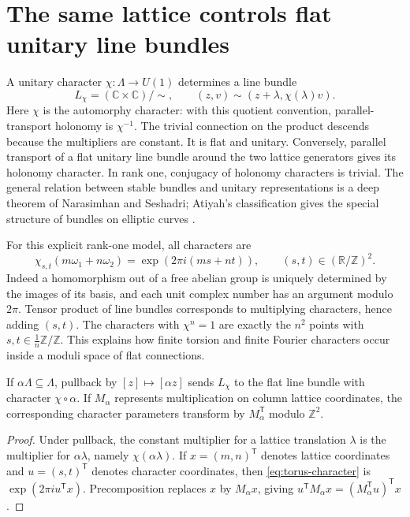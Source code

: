 \section{The same lattice controls flat unitary line bundles}

A unitary character $\chi:\Lambda\to U(1)$ determines a line bundle
\[
 L_\chi=(\mathbb C\times\mathbb C)/\sim,
 \qquad (z,v)\sim(z+\lambda,\chi(\lambda)v).
\]
Here $\chi$ is the automorphy character: with this quotient convention, parallel-transport holonomy is $\chi^{-1}$. The trivial connection on the product descends because the multipliers
are constant.  It is flat and unitary.  Conversely, parallel transport of
a flat unitary line bundle around the two lattice generators gives its
holonomy character.  In rank one, conjugacy of holonomy characters is
trivial.  The general relation between stable bundles and unitary
representations is a deep theorem of Narasimhan and Seshadri; Atiyah's
classification gives the special structure of bundles on elliptic curves
\cite{YMNS1965,YMAtiyah1957}.

For this explicit rank-one model, all characters are
\begin{equation}
 \chi_{s,t}(m\omega_1+n\omega_2)
 =\exp(2\pi i(ms+nt)),\qquad
 (s,t)\in(\mathbb R/\mathbb Z)^2.
 \label{eq:torus-character}
\end{equation}
Indeed a homomorphism out of a free abelian group is uniquely determined
by the images of its basis, and each unit complex number has an argument
modulo $2\pi$.  Tensor product of line bundles corresponds to multiplying
characters, hence adding $(s,t)$.  The characters with $\chi^n=1$ are
exactly the $n^2$ points with $s,t\in\frac1n\mathbb Z/\mathbb Z$.
This explains how finite torsion and finite Fourier characters occur inside
a moduli space of flat connections.

\begin{proposition}
If $\alpha\Lambda\subseteq\Lambda$, pullback by
$[z]\mapsto[\alpha z]$ sends $L_\chi$ to the flat line bundle with
character $\chi\circ\alpha$.  If $M_\alpha$ represents multiplication
on column lattice coordinates, the corresponding character parameters
transform by $M_\alpha^{\mathsf T}$ modulo $\mathbb Z^2$.
\end{proposition}

\begin{proof}
Under pullback, the constant multiplier for a lattice translation $\lambda$ is the multiplier for $\alpha\lambda$, namely $\chi(\alpha\lambda)$.  If $x=(m,n)^{\mathsf T}$ denotes lattice
coordinates and $u=(s,t)^{\mathsf T}$ denotes character coordinates,
then \eqref{eq:torus-character} is $\exp(2\pi i u^{\mathsf T}x)$.
Precomposition replaces $x$ by $M_\alpha x$, giving
$u^{\mathsf T}M_\alpha x=(M_\alpha^{\mathsf T}u)^{\mathsf T}x$.
\end{proof}

